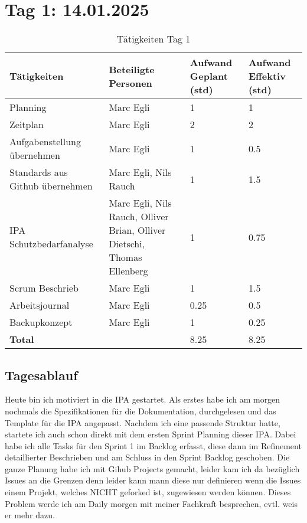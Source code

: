 \section{Tag 1: 14.01.2025}
\begin{table}[H]
    \begin{tabular}{|L{0.4\textwidth}|C{60pt}|C{60pt}|C{60pt}|}
        \hline
        \color{white}Tätigkeiten & \color{white}Beteiligte \color{white}Personen & \color{white}Aufwand Geplant (std) & \color{white}Aufwand Effektiv (std) \\
        \hline
        Planning & Marc Egli & 1 & 1 \\
        \hline
        Zeitplan & Marc Egli & 2 & 2 \\
        \hline
        Aufgabenstellung übernehmen & Marc Egli & 1 & 0.5 \\
        \hline
        Standards aus Github übernehmen & Marc Egli, Nils Rauch & 1 & 1.5 \\
        \hline
        IPA Schutzbedarfanalyse & Marc Egli, Nils Rauch, Olliver Brian, Olliver Dietschi, Thomas Ellenberg & 1 & 0.75 \\
        \hline
        Scrum Beschrieb & Marc Egli & 1 & 1.5 \\
        \hline
        Arbeitsjournal & Marc Egli & 0.25 & 0.5 \\
        \hline
        Backupkonzept & Marc Egli & 1 & 0.25 \\
        \hline
        \textbf{Total} &  & 8.25 & 8.25 \\
        \hline
    \end{tabular}
    \caption{Tätigkeiten Tag 1}
\end{table}

\subsection*{Tagesablauf}
Heute bin ich motiviert in die IPA gestartet. Als erstes habe ich am morgen nochmals die Spezifikationen für
die Dokumentation, durchgelesen und das Template für die IPA angepasst. Nachdem ich eine passende Struktur hatte, 
startete ich auch schon direkt mit dem ersten Sprint Planning dieser IPA. Dabei habe ich alle Tasks für den Sprint 1
im Backlog erfasst, diese dann im Refinement detaillierter Beschrieben und am Schluss in den Sprint Backlog geschoben.
Die ganze Planung habe ich mit Gihub Projects gemacht, leider kam ich da bezüglich Issues an die Grenzen denn leider kann mann 
diese nur definieren wenn die Issues einem Projekt, welches NICHT geforked ist, zugewiesen werden können. Dieses Problem werde
ich am Daily morgen mit meiner Fachkraft besprechen, evtl. weis er mehr dazu. 

